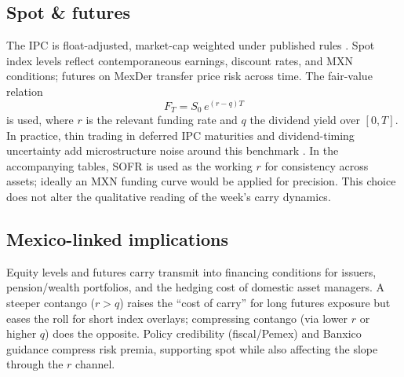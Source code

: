 \documentclass[11pt,a4paper]{article} %
\begin{document}
\subsection{Spot \& futures}
The IPC is float-adjusted, market-cap weighted under published rules \citep{spdj_ipc_page,spdj_bmv_methodology}. Spot index levels reflect contemporaneous earnings, discount rates, and MXN conditions; futures on MexDer transfer price risk across time. The fair-value relation
\[
F_T = S_0\,e^{(r-q)T}
\]
is used, where \(r\) is the relevant funding rate and \(q\) the dividend yield over \([0,T]\). In practice, thin trading in deferred IPC maturities and dividend-timing uncertainty add microstructure noise around this benchmark \citep{mexder_ipc_fut}. In the accompanying tables, SOFR is used as the working \(r\) for consistency across assets; ideally an MXN funding curve would be applied for precision. This choice does not alter the qualitative reading of the week's carry dynamics.

\subsection{Mexico-linked implications}
Equity levels and futures carry transmit into financing conditions for issuers, pension/wealth portfolios, and the hedging cost of domestic asset managers. A steeper contango (\(r>q\)) raises the “cost of carry” for long futures exposure but eases the roll for short index overlays; compressing contango (via lower \(r\) or higher \(q\)) does the opposite. Policy credibility (fiscal/Pemex) and Banxico guidance compress risk premia, supporting spot while also affecting the slope through the \(r\) channel.
\end{document}
